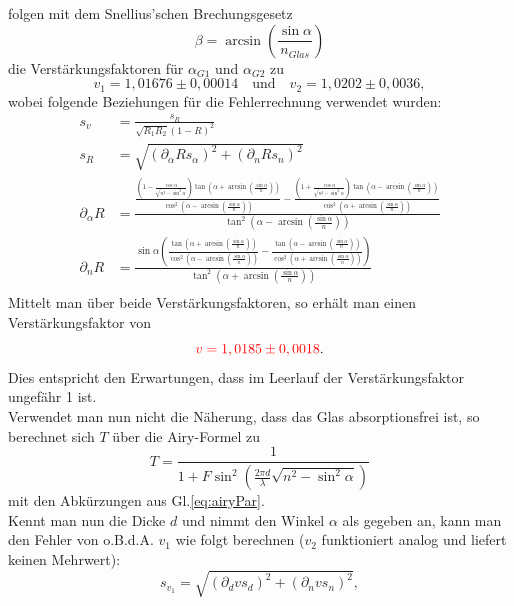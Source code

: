 folgen mit dem Snellius'schen Brechungsgesetz
\begin{equation*}
    \beta = \arcsin(\frac{\sin\alpha}{n_{Glas}})
\end{equation*}
die Verstärkungsfaktoren für $\alpha_{G1}$ und $\alpha_{G2}$ zu 
\begin{equation*}
    v_1 = 1,01676 \pm 0,00014 \quad \mathrm{ und } \quad v_2 = 1,0202 \pm 0,0036,
\end{equation*}
wobei folgende Beziehungen für die Fehlerrechnung verwendet wurden:
\begin{align*}
    s_v &= \frac{s_R}{\sqrt{R_1R_2}(1-R)^2}\\
    s_R &= \sqrt{(\partial_\alpha R s_\alpha)^2 + (\partial_nRs_n)^2}\\
    \partial_\alpha R &= \frac{\frac{(1-\frac{\cos\alpha}{\sqrt{n^2-\sin^2\alpha}})\tan(\alpha+\arcsin(\frac{\sin\alpha}{n}))} {\cos^2(\alpha-\arcsin(\frac{\sin\alpha}{n}))} - \frac{(1+\frac{\cos\alpha}{\sqrt{n^2-\sin^2\alpha}})\tan(\alpha-\arcsin(\frac{\sin\alpha}{n}))} {\cos^2(\alpha+\arcsin(\frac{\sin\alpha}{n}))}} {\tan^2(\alpha - \arcsin(\frac{\sin\alpha}{n}))}\\
    \partial_nR &= \frac{\sin\alpha(\frac{\tan(\alpha+\arcsin(\frac{\sin\alpha}{n}))}{\cos^2(\alpha-\arcsin(\frac{\sin\alpha}{n}))} - \frac{\tan(\alpha-\arcsin(\frac{\sin\alpha}{n}))}{\cos^2(\alpha+\arcsin(\frac{\sin\alpha}{n}))})}{\tan^2(\alpha + \arcsin(\frac{\sin\alpha}{n}))}\\
\end{align*}
Mittelt man über beide Verstärkungsfaktoren, so erhält man einen Verstärkungsfaktor von 
\begin{equation*}
    \textcolor{red}{v = 1,0185 \pm 0,0018}.
\end{equation*}
Dies entspricht den Erwartungen, dass im Leerlauf der Verstärkungsfaktor ungefähr 1 ist.\\
Verwendet man nun nicht die Näherung, dass das Glas absorptionsfrei ist, so berechnet sich $T$ über die Airy-Formel zu 
\begin{equation*}
    T = \frac{1}{1+F\sin^2(\frac{2\pi d}{\lambda}\sqrt{n^2-\sin^2\alpha})}
\end{equation*}
mit den Abkürzungen aus Gl.\ref{eq:airyPar}.\\
Kennt man nun die Dicke $d$ und nimmt den Winkel $\alpha$ als gegeben an, kann man den Fehler von o.B.d.A. $v_1$ wie folgt berechnen ($v_2$ funktioniert analog und liefert keinen Mehrwert):
\begin{equation*}
    s_{v_1} = \sqrt{(\partial_dvs_d)^2 + (\partial_nvs_n)^2},
\end{equation*}
